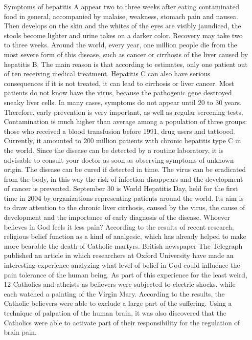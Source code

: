 Symptoms of hepatitis A appear two to three weeks after eating contaminated food in general, accompanied by malaise, weakness, stomach pain and nausea.
Then develops on the skin and the whites of the eyes are visibly jaundiced, the stools become lighter and urine takes on a darker color. Recovery may take two to three weeks.
Around the world, every year, one million people die from the most severe form of this disease, such as cancer or cirrhosis of the liver caused by hepatitis B.
The main reason is that according to estimates, only one patient out of ten receiving medical treatment.
Hepatitis C can also have serious consequences if it is not treated, it can lead to cirrhosis or liver cancer.
Most patients do not know have the virus, because the pathogenic gene destroyed sneaky liver cells. In many cases, symptoms do not appear until 20 to 30 years.
Therefore, early prevention is very important, as well as regular screening tests.
Contamination is much higher than average among a population of three groups: those who received a blood transfusion before 1991, drug users and tattooed.
Currently, it amounted to 200 million patients with chronic hepatitis type C in the world.
Since the disease can be detected by a routine laboratory, it is advisable to consult your doctor as soon as observing symptoms of unknown origin.
The disease can be cured if detected in time. The virus can be eradicated from the body, in this way the risk of infection disappears and the development of cancer is prevented.
September 30 is World Hepatitis Day, held for the first time in 2004 by organizations representing patients around the world.
Its aim is to draw attention to the chronic liver cirrhosis, caused by the virus, the cause of development and the importance of early diagnosis of the disease.
Whoever believes in God feels it less pain?
According to the results of recent research, religious belief function as a kind of analgesic, which has already helped to make more bearable the death of Catholic martyrs.
British newspaper The Telegraph published an article in which researchers at Oxford University have made an interesting experience analyzing what level of belief in God could influence the pain tolerance of the human being.
As part of this experience for the least weird, 12 Catholics and atheists as believers were subjected to electric shocks, while each watched a painting of the Virgin Mary.
According to the results, the Catholic believers were able to exclude a large part of the suffering.
Using a technique of palpation of the human brain, it was also discovered that the Catholics were able to activate part of their responsibility for the regulation of brain pain.
